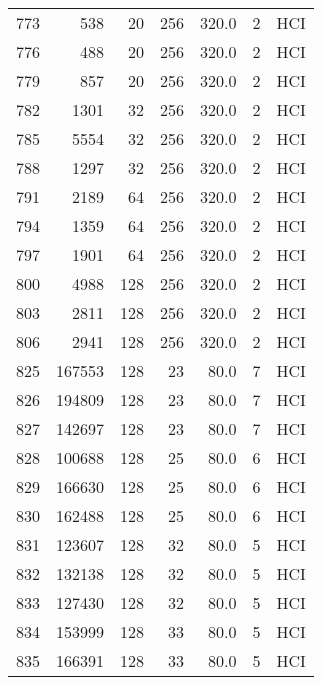 \begin{longtable}{lrrrrrl}
773 &       538 &         20 &       256 &          320.0 &       2 &  HCI \\
776 &       488 &         20 &       256 &          320.0 &       2 &  HCI \\
779 &       857 &         20 &       256 &          320.0 &       2 &  HCI \\
782 &      1301 &         32 &       256 &          320.0 &       2 &  HCI \\
785 &      5554 &         32 &       256 &          320.0 &       2 &  HCI \\
788 &      1297 &         32 &       256 &          320.0 &       2 &  HCI \\
791 &      2189 &         64 &       256 &          320.0 &       2 &  HCI \\
794 &      1359 &         64 &       256 &          320.0 &       2 &  HCI \\
797 &      1901 &         64 &       256 &          320.0 &       2 &  HCI \\
800 &      4988 &        128 &       256 &          320.0 &       2 &  HCI \\
803 &      2811 &        128 &       256 &          320.0 &       2 &  HCI \\
806 &      2941 &        128 &       256 &          320.0 &       2 &  HCI \\
825 &    167553 &        128 &        23 &           80.0 &       7 &  HCI \\
826 &    194809 &        128 &        23 &           80.0 &       7 &  HCI \\
827 &    142697 &        128 &        23 &           80.0 &       7 &  HCI \\
828 &    100688 &        128 &        25 &           80.0 &       6 &  HCI \\
829 &    166630 &        128 &        25 &           80.0 &       6 &  HCI \\
830 &    162488 &        128 &        25 &           80.0 &       6 &  HCI \\
831 &    123607 &        128 &        32 &           80.0 &       5 &  HCI \\
832 &    132138 &        128 &        32 &           80.0 &       5 &  HCI \\
833 &    127430 &        128 &        32 &           80.0 &       5 &  HCI \\
834 &    153999 &        128 &        33 &           80.0 &       5 &  HCI \\
835 &    166391 &        128 &        33 &           80.0 &       5 &  HCI \\

\end{longtable}
